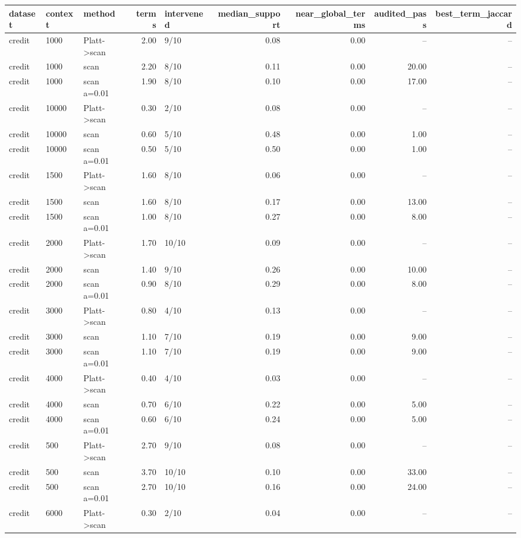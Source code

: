 \begin{tabular}{lllrlrrrr}
\toprule
dataset & context & method & terms & intervened & median_support & near_global_terms & audited_pass & best_term_jaccard \\
\midrule
credit & 1000 & Platt->scan & 2.00 & 9/10 & 0.08 & 0.00 & -- & -- \\
credit & 1000 & scan & 2.20 & 8/10 & 0.11 & 0.00 & 20.00 & -- \\
credit & 1000 & scan a=0.01 & 1.90 & 8/10 & 0.10 & 0.00 & 17.00 & -- \\
credit & 10000 & Platt->scan & 0.30 & 2/10 & 0.08 & 0.00 & -- & -- \\
credit & 10000 & scan & 0.60 & 5/10 & 0.48 & 0.00 & 1.00 & -- \\
credit & 10000 & scan a=0.01 & 0.50 & 5/10 & 0.50 & 0.00 & 1.00 & -- \\
credit & 1500 & Platt->scan & 1.60 & 8/10 & 0.06 & 0.00 & -- & -- \\
credit & 1500 & scan & 1.60 & 8/10 & 0.17 & 0.00 & 13.00 & -- \\
credit & 1500 & scan a=0.01 & 1.00 & 8/10 & 0.27 & 0.00 & 8.00 & -- \\
credit & 2000 & Platt->scan & 1.70 & 10/10 & 0.09 & 0.00 & -- & -- \\
credit & 2000 & scan & 1.40 & 9/10 & 0.26 & 0.00 & 10.00 & -- \\
credit & 2000 & scan a=0.01 & 0.90 & 8/10 & 0.29 & 0.00 & 8.00 & -- \\
credit & 3000 & Platt->scan & 0.80 & 4/10 & 0.13 & 0.00 & -- & -- \\
credit & 3000 & scan & 1.10 & 7/10 & 0.19 & 0.00 & 9.00 & -- \\
credit & 3000 & scan a=0.01 & 1.10 & 7/10 & 0.19 & 0.00 & 9.00 & -- \\
credit & 4000 & Platt->scan & 0.40 & 4/10 & 0.03 & 0.00 & -- & -- \\
credit & 4000 & scan & 0.70 & 6/10 & 0.22 & 0.00 & 5.00 & -- \\
credit & 4000 & scan a=0.01 & 0.60 & 6/10 & 0.24 & 0.00 & 5.00 & -- \\
credit & 500 & Platt->scan & 2.70 & 9/10 & 0.08 & 0.00 & -- & -- \\
credit & 500 & scan & 3.70 & 10/10 & 0.10 & 0.00 & 33.00 & -- \\
credit & 500 & scan a=0.01 & 2.70 & 10/10 & 0.16 & 0.00 & 24.00 & -- \\
credit & 6000 & Platt->scan & 0.30 & 2/10 & 0.04 & 0.00 & -- & -- \\

\end{tabular}
